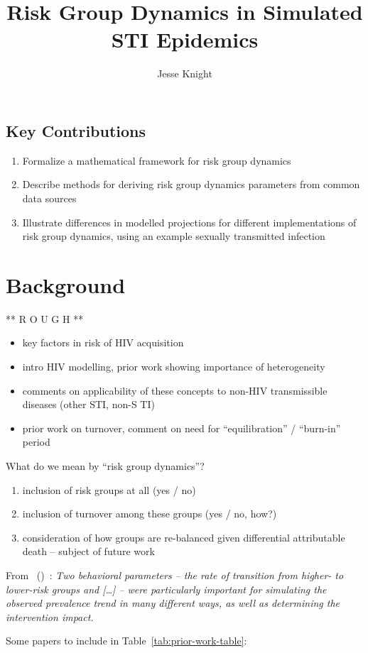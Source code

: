 \documentclass{article}
\title{Risk Group Dynamics in Simulated STI Epidemics}
\author{Jesse Knight}
\numberwithin{equation}{section}
\newcommand{\citet}[1]{\citeauthor{#1}~(\citeyear{#1})~\cite{#1}}
\begin{document}
\maketitle
\tableofcontents
\subsection*{Key Contributions}
\begin{enumerate}
  \item Formalize a mathematical framework for risk group dynamics
  \item Describe methods for deriving risk group dynamics parameters from common data sources
  \item Illustrate differences in modelled projections for different implementations of risk group dynamics,
  using an example sexually transmitted infection
\end{enumerate}
\clearpage
\section{Background}\label{s:background}
** R O U G H **
\begin{itemize}
  \item key factors in risk of HIV acquisition
  \item intro HIV modelling, prior work showing importance of heterogeneity
  \item comments on applicability of these concepts to non-HIV transmissible diseases
        (other STI, non-S TI)
  \item prior work on turnover, comment on need for ``equilibration'' / ``burn-in'' period
\end{itemize}
What do we mean by ``risk group dynamics''?
\begin{enumerate}
  \item inclusion of risk groups at all (yes / no)
  \item inclusion of turnover among these groups (yes / no, how?)
  \item consideration of how groups are re-balanced given differential attributable death
  -- subject of future work
\end{enumerate}
\par
From \citet{Eaton2014}:
\textit{Two behavioral parameters
-- the rate of transition from higher- to lower-risk groups and \textup{[\dots]} -- 
were particularly important for simulating the observed prevalence trend in many different ways,
as well as determining the intervention impact.}
\par
Some papers to include in Table~\ref{tab:prior-work-table}:
\cite{Barnighausen2012,Cremin2013,Eaton2014,Estill2012,Granich2009,Hallett2008,Johnson2006,Phillips2011,Rosenberg2004,Shah2016}
\end{document}
